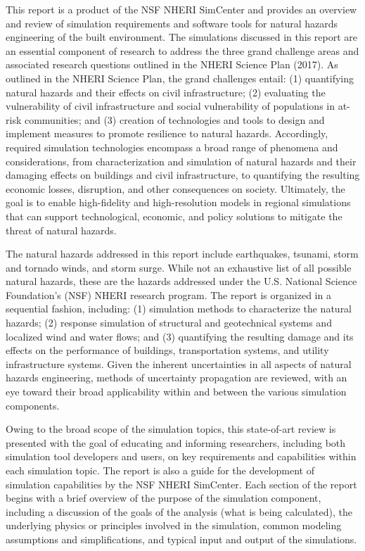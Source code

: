 %
%

\preface

This report is a product of the NSF NHERI SimCenter and provides an overview and review of simulation requirements and software tools for natural hazards engineering of the built environment. The simulations discussed in this report are an essential component of research to address the three grand challenge areas and associated research questions outlined in the NHERI Science Plan (2017). As outlined in the NHERI Science Plan, the grand challenges entail: (1) quantifying natural hazards and their effects on civil infrastructure; (2) evaluating the vulnerability of civil infrastructure and social vulnerability of populations in at-risk communities; and (3) creation of technologies and tools to design and implement measures to promote resilience to natural hazards. Accordingly, required simulation technologies encompass a broad range of phenomena and considerations, from characterization and simulation of natural hazards and their damaging effects on buildings and civil infrastructure, to quantifying the resulting economic losses, disruption, and other consequences on society. Ultimately, the goal is to enable high-fidelity and high-resolution models in regional simulations that can support technological, economic, and policy solutions to mitigate the threat of natural hazards.

The natural hazards addressed in this report include earthquakes, tsunami, storm and tornado winds, and storm surge. While not an exhaustive list of all possible natural hazards, these are the hazards addressed under the U.S. National Science Foundation’s (NSF) NHERI research program. The report is organized in a sequential fashion, including: (1) simulation methods to characterize the natural hazards; (2) response simulation of structural and geotechnical systems and localized wind and water flows; and (3) quantifying the resulting damage and its effects on the performance of buildings, transportation systems, and utility infrastructure systems. Given the inherent uncertainties in all aspects of natural hazards engineering, methods of uncertainty propagation are reviewed, with an eye toward their broad applicability within and between the various simulation components.

Owing to the broad scope of the simulation topics, this state-of-art review is presented with the goal of educating and informing researchers, including both simulation tool developers and users, on key requirements and capabilities within each simulation topic. The report is also a guide for the development of simulation capabilities by the NSF NHERI SimCenter. Each section of the report begins with a brief overview of the purpose of the simulation component, including a discussion of the goals of the analysis (what is being calculated), the underlying physics or principles involved in the simulation, common modeling assumptions and simplifications, and typical input and output of the simulations. 

